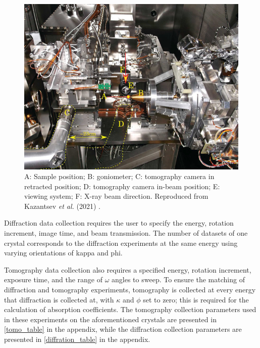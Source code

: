 \begin{figure}
    \centering
    \includegraphics{images/tomo camera.png}
    \caption{A: Sample position; B: goniometer; C: tomography camera in retracted position; D: tomography camera in-beam position; E: viewing system; F: X-ray beam direction. Reproduced from Kazantsev \textit{et al.} (2021) \cite{Kazantsev2021}.}
    \label{fig:vacuum_chamber}
\end{figure}

Diffraction data collection requires the user to specify the energy, rotation increment, image time, and beam transmission. The number of datasets of one crystal corresponds to the diffraction experiments at the same energy using varying orientations of kappa and phi.

Tomography data collection also requires a specified energy, rotation increment, exposure time, and the range of $\omega$ angles to sweep. %
To ensure the matching of diffraction and tomography experiments, tomography is collected at every energy that diffraction is collected at, with $\kappa$ and $\phi$ set to zero; this is required for the calculation of absorption coefficients. The tomography collection parameters used in these experiments on the aforementioned crystals are presented in \cref{tomo_table} in the appendix, while the diffraction collection parameters are presented in \cref{diffration_table} in the appendix.

